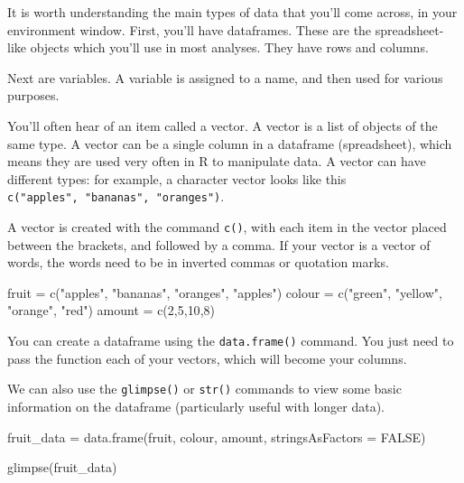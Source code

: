 \documentclass[
]{book}
\newenvironment{Shaded}{\begin{snugshade}}{\end{snugshade}}
\newcommand{\AttributeTok}[1]{\textcolor[rgb]{0.77,0.63,0.00}{#1}}
\newcommand{\ConstantTok}[1]{\textcolor[rgb]{0.00,0.00,0.00}{#1}}
\newcommand{\DecValTok}[1]{\textcolor[rgb]{0.00,0.00,0.81}{#1}}
\newcommand{\FunctionTok}[1]{\textcolor[rgb]{0.00,0.00,0.00}{#1}}
\newcommand{\NormalTok}[1]{#1}
\newcommand{\OtherTok}[1]{\textcolor[rgb]{0.56,0.35,0.01}{#1}}
\newcommand{\StringTok}[1]{\textcolor[rgb]{0.31,0.60,0.02}{#1}}
\begin{document}
It is worth understanding the main types of data that you'll come across, in your environment window. First, you'll have dataframes. These are the spreadsheet-like objects which you'll use in most analyses. They have rows and columns.

Next are variables. A variable is assigned to a name, and then used for various purposes.

You'll often hear of an item called a vector. A vector is a list of objects of the same type. A vector can be a single column in a dataframe (spreadsheet), which means they are used very often in R to manipulate data. A vector can have different types: for example, a character vector looks like this \texttt{c("apples",\ "bananas",\ "oranges")}.

A vector is created with the command \texttt{c()}, with each item in the vector placed between the brackets, and followed by a comma. If your vector is a vector of words, the words need to be in inverted commas or quotation marks.

\begin{Shaded}
\begin{Highlighting}[]
\NormalTok{fruit }\OtherTok{=} \FunctionTok{c}\NormalTok{(}\StringTok{"apples"}\NormalTok{, }\StringTok{"bananas"}\NormalTok{, }\StringTok{"oranges"}\NormalTok{, }\StringTok{"apples"}\NormalTok{)}
\NormalTok{colour }\OtherTok{=} \FunctionTok{c}\NormalTok{(}\StringTok{"green"}\NormalTok{, }\StringTok{"yellow"}\NormalTok{, }\StringTok{"orange"}\NormalTok{, }\StringTok{"red"}\NormalTok{)}
\NormalTok{amount }\OtherTok{=} \FunctionTok{c}\NormalTok{(}\DecValTok{2}\NormalTok{,}\DecValTok{5}\NormalTok{,}\DecValTok{10}\NormalTok{,}\DecValTok{8}\NormalTok{)}
\end{Highlighting}
\end{Shaded}

You can create a dataframe using the \texttt{data.frame()} command. You just need to pass the function each of your vectors, which will become your columns.

We can also use the \texttt{glimpse()} or \texttt{str()} commands to view some basic information on the dataframe (particularly useful with longer data).

\begin{Shaded}
\begin{Highlighting}[]
\NormalTok{fruit\_data }\OtherTok{=} \FunctionTok{data.frame}\NormalTok{(fruit, colour, amount, }\AttributeTok{stringsAsFactors =} \ConstantTok{FALSE}\NormalTok{)}

\FunctionTok{glimpse}\NormalTok{(fruit\_data)}
\end{Highlighting}
\end{Shaded}
\end{document}
